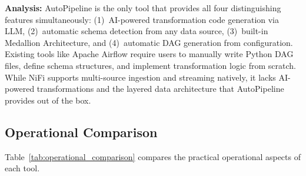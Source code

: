 \textbf{Analysis:} AutoPipeline is the only tool that provides all four distinguishing features simultaneously: (1)~AI-powered transformation code generation via LLM, (2)~automatic schema detection from any data source, (3)~built-in Medallion Architecture, and (4)~automatic DAG generation from configuration. Existing tools like Apache Airflow require users to manually write Python DAG files, define schema structures, and implement transformation logic from scratch. While NiFi supports multi-source ingestion and streaming natively, it lacks AI-powered transformations and the layered data architecture that AutoPipeline provides out of the box.


\subsection{Operational Comparison}

Table~\ref{tab:operational_comparison} compares the practical operational aspects of each tool.

\begin{table}[ht]
\centering
\caption{Operational comparison of data pipeline tools}
\label{tab:operational_comparison}
\end{table}

